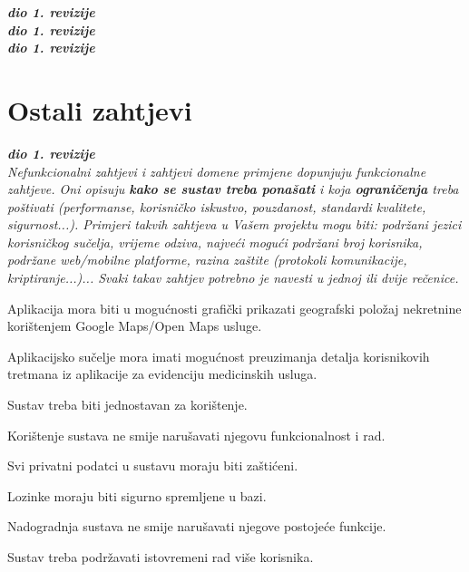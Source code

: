 				\textbf{\textit{dio 1. revizije}}\\
				\textbf{\textit{dio 1. revizije}}\\
				\textbf{\textit{dio 1. revizije}}\\
				
				
				\eject
	
		\section{Ostali zahtjevi}
		
			\textbf{\textit{dio 1. revizije}}\\
		 
			 \textit{Nefunkcionalni zahtjevi i zahtjevi domene primjene dopunjuju funkcionalne zahtjeve. Oni opisuju \textbf{kako se sustav treba ponašati} i koja \textbf{ograničenja} treba poštivati (performanse, korisničko iskustvo, pouzdanost, standardi kvalitete, sigurnost...). Primjeri takvih zahtjeva u Vašem projektu mogu biti: podržani jezici korisničkog sučelja, vrijeme odziva, najveći mogući podržani broj korisnika, podržane web/mobilne platforme, razina zaštite (protokoli komunikacije, kriptiranje...)... Svaki takav zahtjev potrebno je navesti u jednoj ili dvije rečenice.}
			 \begin{packed_item}
                \item Aplikacija mora biti u mogućnosti grafički prikazati geografski položaj nekretnine korištenjem Google Maps/Open Maps usluge.
                \item Aplikacijsko sučelje mora imati mogućnost preuzimanja detalja korisnikovih tretmana iz aplikacije za evidenciju medicinskih usluga.
                \item Sustav treba biti jednostavan za korištenje.
                \item Korištenje sustava ne smije narušavati njegovu funkcionalnost i rad.
                \item Svi privatni podatci u sustavu moraju biti zaštićeni.
                \item Lozinke moraju biti sigurno spremljene u bazi.
                \item Nadogradnja sustava ne smije narušavati njegove postojeće funkcije.
                \item Sustav treba podržavati istovremeni rad više korisnika.
		  	\end{packed_item}
			 
			 
	